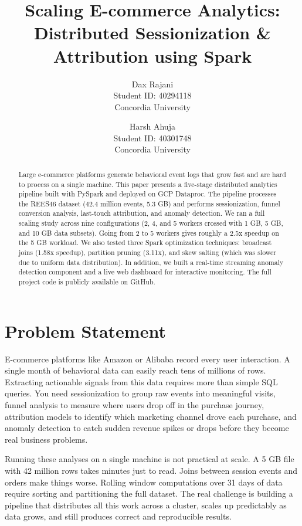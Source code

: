 \documentclass[letterpaper,twocolumn,10pt]{article}
\title{\Large \bf Scaling E-commerce Analytics:\\
Distributed Sessionization \& Attribution using Spark}
\author{
{\rm Dax Rajani}\\
Student ID: 40294118\\
Concordia University
\and
{\rm Harsh Ahuja}\\
Student ID: 40301748\\
Concordia University
}
\date{}
\begin{document}
\maketitle
\pagestyle{plain}

\begin{abstract}
Large e-commerce platforms generate behavioral event logs that grow fast and are
hard to process on a single machine. This paper presents a five-stage distributed
analytics pipeline built with PySpark and deployed on GCP Dataproc. The pipeline
processes the REES46 dataset (42.4 million events, 5.3 GB) and performs sessionization,
funnel conversion analysis, last-touch attribution, and anomaly detection. We ran a
full scaling study across nine configurations (2, 4, and 5 workers crossed with
1 GB, 5 GB, and 10 GB data subsets). Going from 2 to 5 workers gives roughly a 2.5x
speedup on the 5 GB workload. We also tested three Spark optimization techniques:
broadcast joins (1.58x speedup), partition pruning (3.11x), and skew salting (which
was slower due to uniform data distribution). In addition, we built a real-time
streaming anomaly detection component and a live web dashboard for interactive
monitoring. The full project code is publicly available on GitHub.
\end{abstract}

\section{Problem Statement}

E-commerce platforms like Amazon or Alibaba record every user interaction. A single
month of behavioral data can easily reach tens of millions of rows. Extracting
actionable signals from this data requires more than simple SQL queries. You need
sessionization to group raw events into meaningful visits, funnel analysis to measure
where users drop off in the purchase journey, attribution models to identify which
marketing channel drove each purchase, and anomaly detection to catch sudden revenue
spikes or drops before they become real business problems.

Running these analyses on a single machine is not practical at scale. A 5 GB file
with 42 million rows takes minutes just to read. Joins between session events and
orders make things worse. Rolling window computations over 31 days of data require
sorting and partitioning the full dataset. The real challenge is building a pipeline
that distributes all this work across a cluster, scales up predictably as data grows,
and still produces correct and reproducible results.
\end{document}
